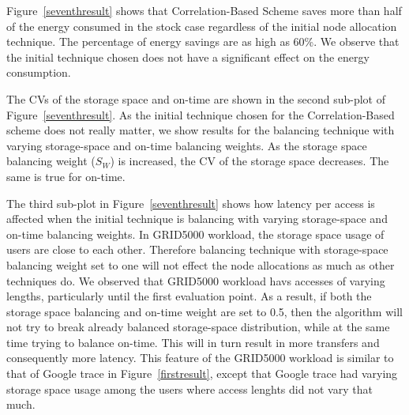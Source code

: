 \documentclass[preprint,12pt]{elsarticle}
\begin{document}
Figure~\ref{seventhresult} shows that Correlation-Based Scheme saves more than half of the energy consumed
in the stock case regardless of the initial node allocation technique. The percentage of energy savings
are as high as 60\%. We observe that the initial technique chosen does not have a significant effect on
the energy consumption.

The CVs of the storage space and on-time are shown in the second sub-plot of Figure~\ref{seventhresult}.
As the initial technique chosen for the Correlation-Based scheme does not really matter, we show
results for the balancing technique with varying storage-space and on-time balancing weights. As the
storage space balancing weight ($S_W$) is increased, the CV of the storage space
decreases. The same is true for on-time.

The third sub-plot in Figure~\ref{seventhresult} shows how latency per access is affected when the initial
technique is balancing with varying storage-space and on-time balancing weights. In GRID5000 workload, the
storage space usage of users are close to each other. Therefore balancing technique with storage-space
balancing weight set to one will not effect the node allocations as much as other techniques do. We observed
that GRID5000 workload havs accesses of varying lengths, particularly
until the first evaluation point. As a result, if both the storage space balancing and on-time weight are set
to 0.5, then the algorithm will not try to break already balanced storage-space distribution, while at the
same time trying to balance on-time. This will in turn result in more transfers and consequently more latency.
This feature of the GRID5000 workload is similar to that of Google trace in Figure~\ref{firstresult}, except
that Google trace had varying storage space usage among the users where access lenghts did not vary that much.
\end{document}
